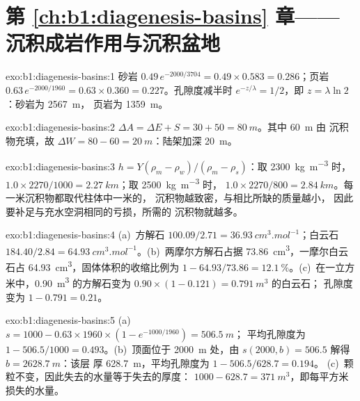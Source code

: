 \section*{第 \ref{ch:b1:diagenesis-basins} 章——沉积成岩作用与沉积盆地}

\begin{solution}{exo:b1:diagenesis-basins:1}
砂岩 $0.49\,e^{-2000/3704} = 0.49\times0.583 = \num{0.286}$；页岩
$0.63\,e^{-2000/1960} = 0.63\times0.360 = \num{0.227}$。孔隙度减半时
$e^{-z/\lambda} = 1/2$，即 $z = \lambda\ln 2$：砂岩为 \qty{2567}{m}，
页岩为 \qty{1359}{m}。
\end{solution}

\begin{solution}{exo:b1:diagenesis-basins:2}
$\Delta A = \Delta E + S = 30 + 50 = \qty{80}{m}$。其中 \qty{60}{m} 由
沉积物充填，故 $\Delta W = 80 - 60 = \qty{20}{m}$：陆架加深
\qty{20}{m}。
\end{solution}

\begin{solution}{exo:b1:diagenesis-basins:3}
$h = Y(\rho_m - \rho_w)/(\rho_m - \rho_s)$：取 \qty{2300}{kg.m^{-3}} 时，
$1.0\times2270/1000 = \qty{2.27}{km}$；取 \qty{2500}{kg.m^{-3}} 时，
$1.0\times2270/800 = \qty{2.84}{km}$。每一米沉积物都取代柱体中一米的，
沉积物越致密，与相比所缺的质量越小，
因此要补足与充水空洞相同的亏损，所需的
沉积物就越多。
\end{solution}

\begin{solution}{exo:b1:diagenesis-basins:4}
(a)~方解石 $100.09/2.71 = \qty{36.93}{cm^3.mol^{-1}}$；白云石 $184.40/2.84
= \qty{64.93}{cm^3.mol^{-1}}$。(b)~两摩尔方解石占据
\qty{73.86}{cm^3}，一摩尔白云石占 \qty{64.93}{cm^3}，固体体积的收缩比例为
$1 - 64.93/73.86 = \qty{12.1}{\%}$。(c)~在一立方米中，\qty{0.90}{m^3}
的方解石变为 $0.90\times(1 - 0.121) = \qty{0.791}{m^3}$ 的白云石；
孔隙度变为 $1 - 0.791 = \num{0.21}$。
\end{solution}

\begin{solution}{exo:b1:diagenesis-basins:5}
(a)~$s = 1000 - 0.63\times1960\times(1 - e^{-1000/1960}) = \qty{506.5}{m}$；
平均孔隙度为 $1 - 506.5/1000 = \num{0.493}$。(b)~顶面位于
\qty{2000}{m} 处，由 $s(2000, b) = 506.5$ 解得 $b = \qty{2628.7}{m}$：该层
厚 \qty{628.7}{m}，平均孔隙度为 $1 - 506.5/628.7 = \num{0.194}$。
(c)~颗粒不变，因此失去的水量等于失去的厚度：
$1000 - 628.7 = \qty{371}{m^3}$，即每平方米损失的水量。
\end{solution}

